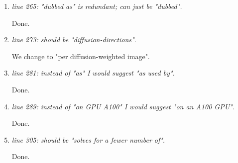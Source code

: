 \documentclass[a4paper,11pt,twoside]{report}
\begin{document}
\begin{enumerate}[resume]
    \item \textit{line 265: "dubbed as" is redundant; can just be "dubbed".}

    \hspace{1em} Done.

    \item \textit{line 273: should be "diffusion-directions".}

    \hspace{1em} We change to "per diffusion-weighted image".

    \item \textit{line 281: instead of "as" I would suggest "as used by".}

    \hspace{1em} Done.

    \item \textit{line 289: instead of "on GPU A100" I would suggest "on an A100 GPU".}

    \hspace{1em} Done.

    \item \textit{line 305: should be "solves for a fewer number of".}

    \hspace{1em} Done.

\end{enumerate}
\end{document}
